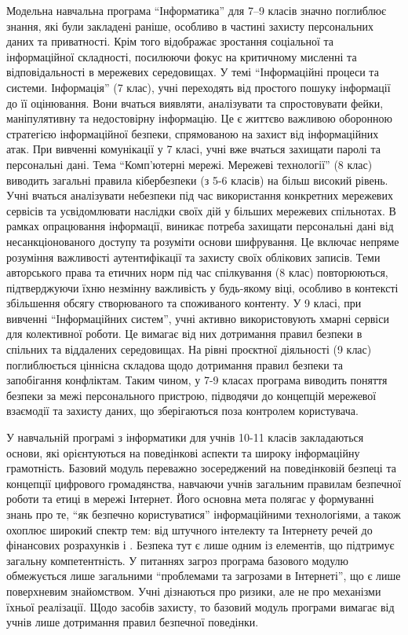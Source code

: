 Модельна навчальна програма ``Інформатика'' для 7–9 класів \cite{inform_7_9_rivkind} значно поглиблює знання, які були закладені раніше, особливо в частині захисту персональних даних та приватності. Крім того відображає зростання соціальної та інформаційної складності, посилюючи фокус на критичному мисленні та відповідальності в мережевих середовищах. У темі ``Інформаційні процеси та системи. Інформація'' (7 клас), учні переходять від простого пошуку інформації до її оцінювання. Вони вчаться виявляти, аналізувати та спростовувати фейки, маніпулятивну та недостовірну інформацію. Це є життєво важливою оборонною стратегією інформаційної безпеки, спрямованою на захист від інформаційних атак. При вивченні комунікації у 7 класі, учні вже вчаться захищати паролі та персональні дані. Тема ``Комп’ютерні мережі. Мережеві технології'' (8 клас) виводить загальні правила кібербезпеки (з 5-6 класів) на більш високий рівень. Учні вчаться аналізувати небезпеки під час використання конкретних мережевих сервісів та усвідомлювати наслідки своїх дій у більших мережевих спільнотах. В рамках опрацювання інформації, виникає потреба захищати персональні дані від несанкціонованого доступу та розуміти основи шифрування. Це включає непряме розуміння важливості аутентифікації та захисту своїх облікових записів. Теми авторського права та етичних норм під час спілкування (8 клас) повторюються, підтверджуючи їхню незмінну важливість у будь-якому віці, особливо в контексті збільшення обсягу створюваного та споживаного контенту. У 9 класі, при вивченні ``Інформаційних систем'', учні активно використовують хмарні сервіси для колективної роботи. Це вимагає від них дотримання правил безпеки в спільних та віддалених середовищах.  На рівні проєктної діяльності (9 клас) поглиблюється ціннісна складова щодо дотримання правил безпеки та запобігання конфліктам. Таким чином,  у 7-9 класах програма виводить поняття безпеки за межі персонального пристрою, підводячи до концепцій мережевої взаємодії та захисту даних, що зберігаються поза контролем користувача.

У навчальній програмі з інформатики для учнів 10-11 класів \cite{inform_10_11_standart} закладаються основи, які орієнтуються на поведінкові аспекти та широку інформаційну грамотність. Базовий модуль переважно зосереджений на поведінковій безпеці та концепції цифрового громадянства, навчаючи учнів загальним правилам безпечної роботи та етиці в мережі Інтернет. Його основна мета полягає у формуванні знань про те, ``як безпечно користуватися'' інформаційними технологіями, а також охоплює широкий спектр тем: від штучного інтелекту та Інтернету речей до фінансових розрахунків і . Безпека тут є лише одним із елементів, що підтримує загальну компетентність. У питаннях загроз програма базового модулю обмежується лише загальними ``проблемами та загрозами в Інтернеті'', що є лише поверхневим знайомством. Учні дізнаються про ризики, але не про механізми їхньої реалізації. Щодо засобів захисту, то базовий модуль програми вимагає від учнів лише дотримання правил безпечної поведінки.

